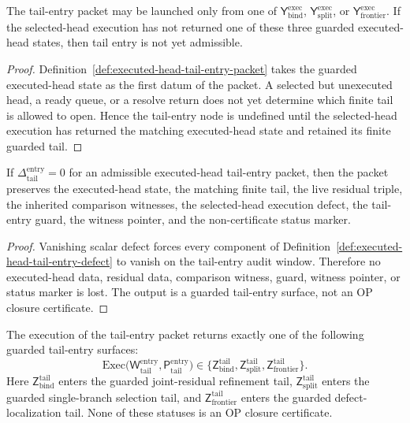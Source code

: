 \begin{lemma}
\label{lem:executed-head-is-tail-entry-precondition}
The tail-entry packet may be launched only from one of \(\mathsf Y_{\mathrm{bind}}^{\mathrm{exec}}\), \(\mathsf Y_{\mathrm{split}}^{\mathrm{exec}}\), or \(\mathsf Y_{\mathrm{frontier}}^{\mathrm{exec}}\).  If the selected-head execution has not returned one of these three guarded executed-head states, then tail entry is not yet admissible.
\end{lemma}

\begin{proof}
Definition~\ref{def:executed-head-tail-entry-packet} takes the guarded executed-head state as the first datum of the packet.  A selected but unexecuted head, a ready queue, or a resolve return does not yet determine which finite tail is allowed to open.  Hence the tail-entry node is undefined until the selected-head execution has returned the matching executed-head state and retained its finite guarded tail.
\end{proof}

\begin{lemma}
\label{lem:zero-tail-entry-defect-preserves-tail-entry-data}
If \(\Delta_{\mathrm{tail}}^{\mathrm{entry}}=0\) for an admissible executed-head tail-entry packet, then the packet preserves the executed-head state, the matching finite tail, the live residual triple, the inherited comparison witnesses, the selected-head execution defect, the tail-entry guard, the witness pointer, and the non-certificate status marker.
\end{lemma}

\begin{proof}
Vanishing scalar defect forces every component of Definition~\ref{def:executed-head-tail-entry-defect} to vanish on the tail-entry audit window.  Therefore no executed-head data, residual data, comparison witness, guard, witness pointer, or status marker is lost.  The output is a guarded tail-entry surface, not an OP closure certificate.
\end{proof}

\begin{definition}
\label{def:executed-head-tail-entry-output}
The execution of the tail-entry packet returns exactly one of the following guarded tail-entry surfaces:
\[
\mathrm{Exec}\bigl(\mathsf W_{\mathrm{tail}}^{\mathrm{entry}},
                   \mathsf P_{\mathrm{tail}}^{\mathrm{entry}}\bigr)
\in
\{\mathsf Z_{\mathrm{bind}}^{\mathrm{tail}},
  \mathsf Z_{\mathrm{split}}^{\mathrm{tail}},
  \mathsf Z_{\mathrm{frontier}}^{\mathrm{tail}}\}.
\]
Here \(\mathsf Z_{\mathrm{bind}}^{\mathrm{tail}}\) enters the guarded joint-residual refinement tail, \(\mathsf Z_{\mathrm{split}}^{\mathrm{tail}}\) enters the guarded single-branch selection tail, and \(\mathsf Z_{\mathrm{frontier}}^{\mathrm{tail}}\) enters the guarded defect-localization tail.  None of these statuses is an OP closure certificate.
\end{definition}


